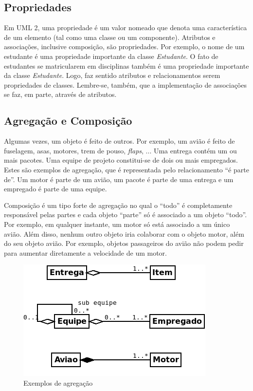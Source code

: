 \subsection{Propriedades}

Em UML 2, uma propriedade é um valor nomeado que denota uma característica de um elemento (tal como uma classe ou um componente). Atributos e associações, inclusive composição, são propriedades. Por exemplo, o nome de um estudante é uma propriedade importante da classe \emph{Estudante}. O fato de estudantes se matricularem em disciplinas também é uma propriedade importante da classe \emph{Estudante}. Logo, faz sentido atributos e relacionamentos serem propriedades de classes. Lembre-se, também, que a implementação de associações se faz, em parte, através de atributos.

\subsection{Agregação e Composição}

Algumas vezes, um objeto é feito de outros. Por exemplo, um avião é feito de fuselagem, asas, motores, trem de pouso, \textit{flaps}, ... Uma entrega contém um ou mais pacotes. Uma equipe de projeto constitui-se de dois ou mais empregados. Estes são exemplos de agregação, que é representada pelo relacionamento ``é parte de''. Um motor é parte de um avião, um pacote é parte de uma entrega e um empregado é parte de uma equipe.

Composição é um tipo forte de agregação no qual o ``todo'' é completamente responsável pelas partes e cada objeto ``parte'' só é associado a um objeto ``todo''. Por exemplo, em qualquer instante, um motor só está associado a um único avião. Além disso, nenhum outro objeto iria colaborar com o objeto motor, além do seu objeto avião. Por exemplo, objetos passageiros do avião não podem pedir para aumentar diretamente a velocidade de um motor.

\begin{figure}[h]
\begin{center}
\includegraphics[scale=0.6]{agreg.png} 
\caption{Exemplos de agregação} \label{fig:uml8}
\end{center}\end{figure}


